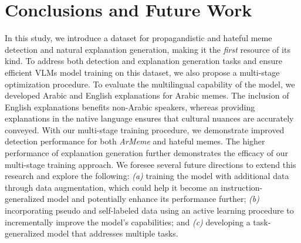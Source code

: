 \section{Conclusions and Future Work}
\label{sec:conclusions}
In this study, we introduce a \memex{} dataset for propagandistic and hateful meme detection and natural explanation generation, making it the \textit{first} resource of its kind. To address both detection and explanation generation tasks and ensure efficient VLMs model training on this dataset, we also propose a multi-stage optimization procedure.  
To evaluate the multilingual capability of the model, we developed Arabic and English explanations for Arabic memes. The inclusion of English explanations benefits non-Arabic speakers, whereas providing explanations in the native language ensures that cultural nuances are accurately conveyed. With our multi-stage training procedure, we demonstrate improved detection performance for both \textit{ArMeme} and hateful memes. The higher performance of explanation generation further demonstrates the efficacy of our multi-stage training approach.  
We foresee several future directions to extend this research and explore the following: \textit{(a)} training the model with additional data through data augmentation, which could help it become an instruction-generalized model and potentially enhance its performance further; \textit{(b)} incorporating pseudo and self-labeled data using an active learning procedure to incrementally improve the model's capabilities; and \textit{(c)} developing a task-generalized model that addresses multiple tasks.

